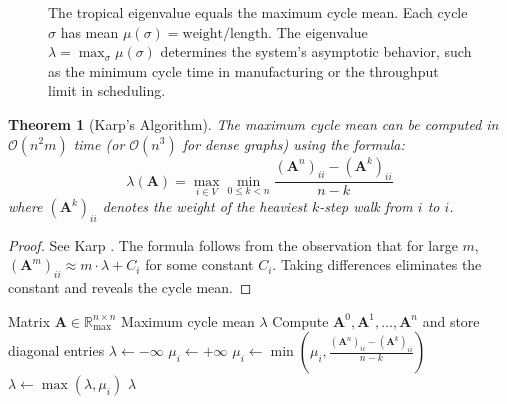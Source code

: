 \documentclass[11pt,a4paper]{article}
\theoremstyle{plain}
\newtheorem{theorem}{Theorem}[section]
\theoremstyle{definition}
\newcommand{\Rmax}{\mathbb{R}_{\max}}
\newcommand{\bigO}{\mathcal{O}}
\newcommand{\mat}[1]{\mathbf{#1}}
\begin{document}
\begin{figure}[htbp]
\caption{The tropical eigenvalue equals the maximum cycle mean. Each cycle $\sigma$ has mean $\mu(\sigma) = \text{weight}/\text{length}$. The eigenvalue $\lambda = \max_\sigma \mu(\sigma)$ determines the system's asymptotic behavior, such as the minimum cycle time in manufacturing or the throughput limit in scheduling.}
\label{fig:cycle-mean-eigenvalue}
\end{figure}

\begin{theorem}[Karp's Algorithm]
\label{thm:karp}
The maximum cycle mean can be computed in $\bigO(n^2 m)$ time (or $\bigO(n^3)$ for dense graphs) using the formula:
\begin{equation}
    \lambda(\mat{A}) = \max_{i \in V} \min_{0 \leq k < n} \frac{(\mat{A}^n)_{ii} - (\mat{A}^k)_{ii}}{n - k}
\end{equation}
where $(\mat{A}^k)_{ii}$ denotes the weight of the heaviest $k$-step walk from $i$ to $i$.
\end{theorem}

\begin{proof}
See Karp \cite{karp1978characterization}. The formula follows from the observation that for large $m$, $(\mat{A}^m)_{ii} \approx m \cdot \lambda + C_i$ for some constant $C_i$. Taking differences eliminates the constant and reveals the cycle mean.
\end{proof}

\begin{algorithm}[htbp]
\caption{Karp's Algorithm for Maximum Cycle Mean}
\label{alg:karp}
\begin{algorithmic}[1]
\Require Matrix $\mat{A} \in \Rmax^{n \times n}$
\Ensure Maximum cycle mean $\lambda$
\State Compute $\mat{A}^0, \mat{A}^1, \ldots, \mat{A}^n$ and store diagonal entries
\State $\lambda \leftarrow -\infty$
    \State $\mu_i \leftarrow +\infty$ 
        \If{$(\mat{A}^n)_{ii} \neq -\infty$ and $(\mat{A}^k)_{ii} \neq -\infty$}
            \State $\mu_i \leftarrow \min\left(\mu_i, \frac{(\mat{A}^n)_{ii} - (\mat{A}^k)_{ii}}{n - k}\right)$ 
        \EndIf
    \EndFor
    \State $\lambda \leftarrow \max(\lambda, \mu_i)$ 
\EndFor
\State \Return $\lambda$
\end{algorithmic}
\end{algorithm}
\end{document}
